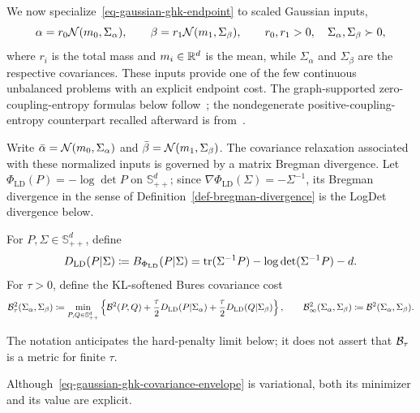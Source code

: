 We now specialize~\eqref{eq-gaussian-ghk-endpoint} to scaled Gaussian inputs,
\[
\alpha=r_0\mathcal{N}(m_0,\Sigma_\alpha),
\qquad
\beta=r_1\mathcal{N}(m_1,\Sigma_\beta),
\qquad
r_0,r_1>0,\quad \Sigma_\alpha,\Sigma_\beta\succ0,
\]
where $r_i$ is the total mass and $m_i\in\mathbb{R}^d$ is the mean, while $\Sigma_\alpha$ and $\Sigma_\beta$ are the respective covariances. These inputs provide one of the few continuous unbalanced problems with an explicit endpoint cost. The graph-supported zero-coupling-entropy formulas below follow~\cite{YangZhang2026}; the nondegenerate positive-coupling-entropy counterpart recalled afterward is from~\cite{janati2020gaussian}.

Write $\bar\alpha=\mathcal{N}(m_0,\Sigma_\alpha)$ and $\bar\beta=\mathcal{N}(m_1,\Sigma_\beta)$. The covariance relaxation associated with these normalized inputs is governed by a matrix Bregman divergence. Let $\Phi_{\mathrm{LD}}(P)=-\log\det P$ on $\mathbb S_{++}^d$; since $\nabla\Phi_{\mathrm{LD}}(\Sigma)=-\Sigma^{-1}$, its Bregman divergence in the sense of Definition~\ref{def-bregman-divergence} is the LogDet divergence below.

\begin{defn}\label{def-gaussian-soft-bures}
For $P,\Sigma\in\mathbb S_{++}^d$, define
\begin{equation}\label{eq-logdet-divergence-gaussian-uot}
D_{\mathrm{LD}}(P|\Sigma)
\coloneqq
B_{\Phi_{\mathrm{LD}}}(P|\Sigma)
=
\operatorname{tr}(\Sigma^{-1}P)-\log\det(\Sigma^{-1}P)-d.
\end{equation}
For $\tau>0$, define the KL-softened Bures covariance cost
\begin{equation}\label{eq-gaussian-ghk-covariance-envelope}
\mathcal{B}_\tau^2(\Sigma_\alpha,\Sigma_\beta)
\coloneqq
\min_{P,Q\in\mathbb S_{++}^d}
\left\{
\mathcal{B}^2(P,Q)
+\frac{\tau}{2}D_{\mathrm{LD}}(P|\Sigma_\alpha)
+\frac{\tau}{2}D_{\mathrm{LD}}(Q|\Sigma_\beta)
\right\},
\qquad
\mathcal{B}_\infty^2(\Sigma_\alpha,\Sigma_\beta)
\coloneqq
\mathcal{B}^2(\Sigma_\alpha,\Sigma_\beta).
\end{equation}
\end{defn}
The notation anticipates the hard-penalty limit below; it does not assert that $\mathcal{B}_\tau$ is a metric for finite $\tau$.

Although~\eqref{eq-gaussian-ghk-covariance-envelope} is variational, both its minimizer and its value are explicit.


